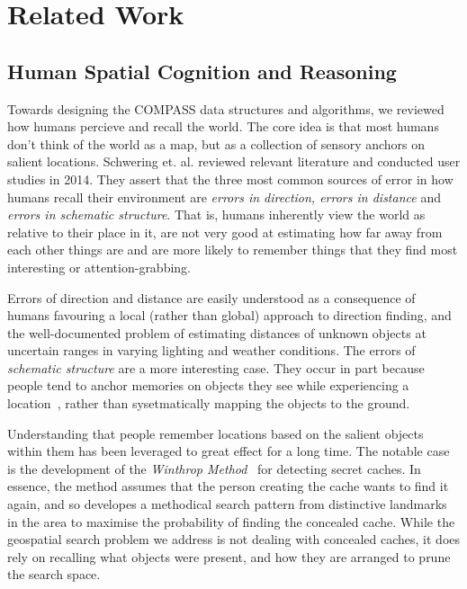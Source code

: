 \section{Related Work}
\label{section:related}


\subsection{Human Spatial Cognition and Reasoning}
\par{Towards designing the COMPASS data structures and algorithms, we reviewed how humans percieve and recall the world. 
The core idea is that most humans don't think of the world as a map, but as a collection of sensory anchors on salient locations. 
Schwering et. al. reviewed relevant literature and conducted user studies in 2014. 
They assert that the three most common sources of error in how humans recall their environment are \textit{errors in direction, errors in distance} and \textit{errors in schematic structure}.
That is, humans inherently view the world as relative to their place in it, are not very good at estimating how far away from each other things are and are more likely to remember things that they find most interesting or attention-grabbing.}
%
\par{Errors of direction and distance are easily understood as a consequence of humans favouring a local (rather than global) approach to direction finding, and the well-documented problem of estimating distances of unknown objects at uncertain ranges in varying lighting and weather conditions. 
The errors of \textit{schematic structure} are a more interesting case. 
They occur in part because people tend to anchor memories on objects they see while experiencing a location~\cite{Helbing2020}, rather than sysetmatically mapping the objects to the ground.}
% 
\par{Understanding that people remember locations based on the salient objects within them has been leveraged to great effect for a long time.
The notable case is the development of the \textit{Winthrop Method}~\cite{Keatley2021} for detecting secret caches.
In essence, the method assumes that the person creating the cache wants to find it again, and so developes a methodical search pattern from distinctive landmarks in the area to maximise the probability of finding the concealed cache. 
While the geospatial search problem we address is not dealing with concealed caches, it does rely on recalling what objects were present, and how they are arranged to prune the search space.}
